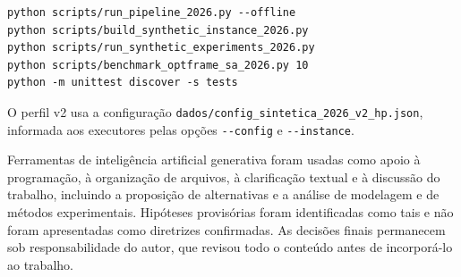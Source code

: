 \begin{singlespace}
\small
\begin{verbatim}
python scripts/run_pipeline_2026.py --offline
python scripts/build_synthetic_instance_2026.py
python scripts/run_synthetic_experiments_2026.py
python scripts/benchmark_optframe_sa_2026.py 10
python -m unittest discover -s tests
\end{verbatim}
\end{singlespace}

O perfil v2 usa a configuração \texttt{dados/config\_sintetica\_2026\_v2\_hp.json}, informada aos executores pelas opções \texttt{-{}-config} e \texttt{-{}-instance}. 




Ferramentas de inteligência artificial generativa foram usadas como apoio à programação, à organização de arquivos, à clarificação textual e à discussão do trabalho, incluindo a proposição de alternativas e a análise de modelagem e de métodos experimentais. Hipóteses provisórias foram identificadas como tais e não foram apresentadas como diretrizes confirmadas. As decisões finais permanecem sob responsabilidade do autor, que revisou todo o conteúdo antes de incorporá-lo ao trabalho. 
